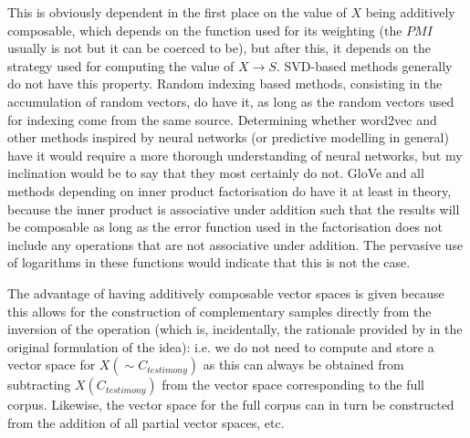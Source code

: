 This is obviously dependent in the first place on the value of $X$ being additively composable, which depends on the function used for its weighting (the $PMI$ usually is not but it can be coerced to be), but after this, it depends on the strategy used for computing the value of $X \rightarrow S$.
SVD-based methods generally do not have this property.
Random indexing based methods, consisting in the accumulation of random vectors, do have it, as long as the random vectors used for indexing come from the same source.
Determining whether word2vec and other methods inspired by neural networks (or predictive modelling in general) have it would require a more thorough understanding of neural networks, but my inclination would be to say that they most certainly do not.
GloVe and all methods depending on inner product factorisation do have it at least in theory, because the inner product is associative under addition such that the results will be composable as long as the error function used in the factorisation does not include any operations that are not associative under addition.
The pervasive use of logarithms in these functions would indicate that this is not the case.

The advantage of having additively composable vector spaces is given because this allows for the construction of complementary samples directly from the inversion of the operation (which is, incidentally, the rationale provided by \citeauthor{shorrocks1980} in the original formulation of the idea): i.e. we do not need to compute and store a vector space for $X(\sim C_{testimony})$ as this can always be obtained from subtracting $X(C_{testimony})$ from the vector space corresponding to the full corpus.
Likewise, the vector space for the full corpus can in turn be constructed from the addition of all partial vector spaces, etc.

